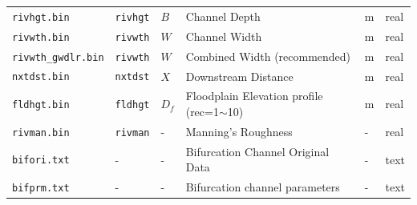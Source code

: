 \begin{table}[htbp]
\begin{tabular}[h]{p{3.5cm}p{1.5cm}p{1.5cm}p{5cm}p{1cm}p{1cm}}
    \texttt{rivhgt.bin}         & \texttt{rivhgt}   & $B$                         & Channel Depth                          & m       & real    \\
    \texttt{rivwth.bin}        & \texttt{rivwth}   & $W$                        & Channel Width                           & m       & real    \\
    \texttt{rivwth\_gwdlr.bin} & \texttt{rivwth}   & $W$                    & Combined Width (recommended)    & m       & real    \\
    \texttt{nxtdst.bin}        & \texttt{nxtdst}   & $X$                             & Downstream Distance                          & m       & real    \\
    \texttt{fldhgt.bin}        & \texttt{fldhgt}   & $D_f$                            & Floodplain Elevation profile (rec=1$\sim$10) & m       & real    \\
    \texttt{rivman.bin}        & \texttt{rivman}   & -                             & Manning’s Roughness                          & -       & real    \\
    \texttt{bifori.txt}        & -        & -                             & Bifurcation Channel Original Data            & -       & text    \\
    \texttt{bifprm.txt}        & -        & -                             & Bifurcation channel parameters               & -       & text    \\ \bottomrule
    \end{tabular}
\end{table}


